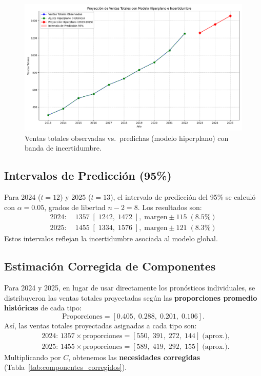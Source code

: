 \documentclass[12pt,a4paper]{article}
\begin{document}
\begin{figure}[H]
\centering
\includegraphics[width=0.7\linewidth]{Proyeccion de ventas totales con modelo hiperplano e incertidumbre.png}
\caption{Ventas totales observadas vs.\ predichas (modelo hiperplano) con banda de incertidumbre.}
\label{fig:ajuste_global_hiperplano_img}
\end{figure}

\subsection{Intervalos de Predicción (95\%)}
Para 2024 ($t=12$) y 2025 ($t=13$), el intervalo de predicción del 95\% se calculó con
\(\alpha=0.05\), grados de libertad $n-2=8$. Los resultados son:
\[
\begin{aligned}
2024: &\;1357\;[\;1242,\;1472\;],\;\text{margen} \pm115\;(8.5\%)\\
2025: &\;1455\;[\;1334,\;1576\;],\;\text{margen} \pm121\;(8.3\%)
\end{aligned}
\]
Estos intervalos reflejan la incertidumbre asociada al modelo global.

\subsection{Estimación Corregida de Componentes}
Para 2024 y 2025, en lugar de usar directamente los pronósticos individuales, se distribuyeron las ventas totales proyectadas según las \textbf{proporciones promedio históricas} de cada tipo:
\[
\text{Proporciones} = [0.405,\;0.288,\;0.201,\;0.106].
\]
Así, las ventas totales proyectadas asignadas a cada tipo son:
\[
\begin{aligned}
&2024:\,1357\times\text{proporciones} = [550,\;391,\;272,\;144]\;\text{(aprox.)},\\
&2025:\,1455\times\text{proporciones} = [589,\;419,\;292,\;155]\;\text{(aprox.)}.
\end{aligned}
\]
Multiplicando por $C$, obtenemos las \textbf{necesidades corregidas} (Tabla~\ref{tab:componentes_corregidos}).
\end{document}
